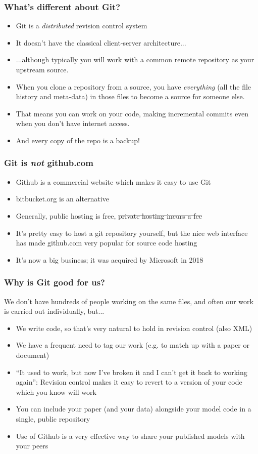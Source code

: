 \documentclass{beamer}
\begin{document}
\begin{frame}
  \frametitle{What's different about Git?}
  \begin{itemize}
  \item Git is a \emph{distributed} revision control system
  \pause \item It doesn't have the classical client-server architecture...
  \pause \item ...although typically you will work with a common
  \alert{remote} repository as your \alert{upstream} source.
  \pause \item When you \alert{clone} a repository from a source, you have
    \emph{everything} (all the file history and meta-data) in those
    files to become a source for someone else.
  \pause \item That means you can work on your code, making incremental
  \alert{commits} even when you don't have internet access.
  \pause \item And every copy of the \alert{repo} is a backup!
  \end{itemize}
\end{frame}

\begin{frame}
  \frametitle{Git is \emph{not} github.com}
  \begin{itemize}
  \item Github is a commercial website which makes it easy to use Git
  \item bitbucket.org is an alternative
  \pause \item Generally, public hosting is free, \sout{private hosting
  incurs a fee}
  \pause \item It's pretty easy to host a git repository yourself, but
  the nice web interface has made github.com very
  popular for source code hosting
  \pause \item It's now a big business; it was acquired by Microsoft in 2018
  \end{itemize}
\end{frame}

\begin{frame}
  \frametitle{Why is Git good for us?}
  We don't have hundreds of people working on the same files, and
  often our work is carried out individually, but...
  \begin{itemize}
    \pause \item We write code, so that's very natural to hold in
    revision control (also XML)
    \pause \item We have a frequent need to \alert{tag} our work (e.g. to
    match up with a paper or document)
    \pause \item ``It used to work, but now I've broken it and I can't
    get it back to working again'': Revision control makes it easy to
    revert to a version of your code which you know will work
    \pause \item You can include your paper (and your data) alongside your model code
    in a single, public repository
    \item Use of Github is a very effective way to share your
    published models with your peers
  \end{itemize}
\end{frame}
\end{document}
